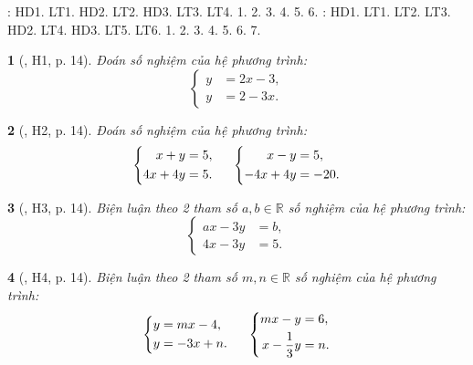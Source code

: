 \documentclass{article}
\newtheorem{baitoan}{}
\begin{document}
\noindent\cite[\S2, pp. 12--18]{SGK_Toan_9_Canh_Dieu_tap_1}: HD1. LT1. HD2. LT2. HD3. LT3. LT4. 1. 2. 3. 4. 5. 6. \cite[\S3, pp. 19--25]{SGK_Toan_9_Canh_Dieu_tap_1}: HD1. LT1. LT2. LT3. HD2. LT4. HD3. LT5. LT6. 1. 2. 3. 4. 5. 6. 7.

\begin{baitoan}[\cite{Binh_boi_duong_Toan_9_tap_2}, H1, p. 14]
	Đoán số nghiệm của hệ phương trình:
	\begin{equation*}
		\left\{\begin{split}
			y &= 2x - 3,\\
			y &= 2 - 3x.
		\end{split}\right.
	\end{equation*}
\end{baitoan}

\begin{baitoan}[\cite{Binh_boi_duong_Toan_9_tap_2}, H2, p. 14]
	Đoán số nghiệm của hệ phương trình:
	\begin{equation*}
		\left\{\begin{split}
			x + y &= 5,\\
			4x + 4y &= 5.
		\end{split}\right.\hspace{5mm}
		\left\{\begin{split}
			x - y &= 5,\\
			-4x + 4y &= -20.
		\end{split}\right.
	\end{equation*}
\end{baitoan}

\begin{baitoan}[\cite{Binh_boi_duong_Toan_9_tap_2}, H3, p. 14]
	Biện luận theo 2 tham số $a,b\in\mathbb{R}$ số nghiệm của hệ phương trình:
	\begin{equation*}
		\left\{\begin{split}
			ax - 3y &= b,\\
			4x - 3y &= 5.
		\end{split}\right.
	\end{equation*}
\end{baitoan}

\begin{baitoan}[\cite{Binh_boi_duong_Toan_9_tap_2}, H4, p. 14]
	Biện luận theo 2 tham số $m,n\in\mathbb{R}$ số nghiệm của hệ phương trình:
	\begin{equation*}
		\left\{\begin{split}
			y &= mx - 4,\\
			y &= -3x + n.
		\end{split}\right.\hspace{5mm}
		\left\{\begin{split}
			mx - y &= 6,\\
			x - \dfrac{1}{3}y &= n.
		\end{split}\right.
	\end{equation*}
\end{baitoan}
\end{document}
